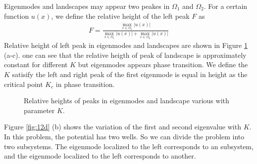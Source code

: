 \documentclass[12pt,a4paper]{article}
\begin{document}
Eigenmodes and landscapes may appear two peakes in $\Omega_1$ and $\Omega_2$. For a certain function $u(x)$, we define the relative height of the left peak $F$ as 
\begin{align}
F = \frac{\max_{x \in \Omega_1} |u(x)|}{\max_{x \in \Omega_1} |u(x)| + \max_{x \in \Omega_2} |u(x)|}
\end{align}
Relative height of left peak in eigenmodes and landscapes are shown in Figure \ref{fig:12f} (a-c). one can see that the relative heigth of peak of landscape is approximately constant for different $K$ but eigenmodes appears phase transition. We define the $K$ satisify the left and right peak of the first eigenmode is equal in height as the critical point $K_c$ in phase transition.
\begin{figure}[h]
\centering
{}
\caption{Relative heights of peaks in eigenmodes and landscape various with parameter $K$.}
\label{fig:12f}
\end{figure}


Figure \ref{fig:12d} (b) shows the variation of the first and second eigenvalue with $K$. In this problem, the potential has two wells. So we can divide the problem into two subsystems. The eigenmode localized to the left corresponds to an subsystem, and the eigenmode localized to the left corresponds to another.
\end{document}
